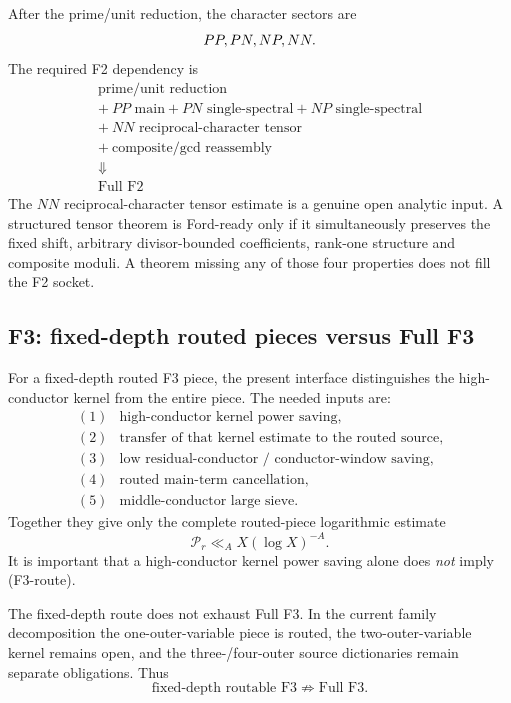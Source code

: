 \documentclass[11pt]{article}
\theoremstyle{definition}
\theoremstyle{remark}
\newcommand{\1}{\mathbf 1}
\begin{document}
After the prime/unit reduction, the character sectors are
\[
 PP,\\ PN,\\ NP,\\ NN.
\]
The required F2 dependency is
\[
 \boxed{\begin{array}{c}
 \text{prime/unit reduction}\\
 +\ PP\text{ main}+PN\text{ single-spectral}+NP\text{ single-spectral}\\
 +\ NN\text{ reciprocal-character tensor}\\
 +\ \text{composite/gcd reassembly}\\
 \Downarrow\\
 \text{Full F2}
 \end{array}}
\tag{F2-full}
\]
The $NN$ reciprocal-character tensor estimate is a genuine open analytic input.  A structured tensor theorem is
Ford-ready only if it simultaneously preserves the fixed shift, arbitrary divisor-bounded coefficients, rank-one
structure and composite moduli.  A theorem missing any of those four properties does not fill the F2 socket.

\subsection{F3: fixed-depth routed pieces versus Full F3}

For a fixed-depth routed F3 piece, the present interface distinguishes the high-conductor kernel from the entire
piece.  The needed inputs are:
\[
 \begin{array}{ll}
 (1)&\text{high-conductor kernel power saving},\\
 (2)&\text{transfer of that kernel estimate to the routed source},\\
 (3)&\text{low residual-conductor / conductor-window saving},\\
 (4)&\text{routed main-term cancellation},\\
 (5)&\text{middle-conductor large sieve}.
 \end{array}
\tag{F3-inputs}
\]
Together they give only the complete routed-piece logarithmic estimate
\[
 \boxed{\mathcal P_r\ll_A X(\log X)^{-A}.}
\tag{F3-route}
\]
It is important that a high-conductor kernel power saving alone does \emph{not} imply (F3-route).

The fixed-depth route does not exhaust Full F3.  In the current family decomposition the one-outer-variable
piece is routed, the two-outer-variable kernel remains open, and the three-/four-outer source dictionaries remain
separate obligations.  Thus
\[
 \boxed{\text{fixed-depth routable F3}\not\Rightarrow\text{Full F3}.}
\tag{F3-notfull}
\]
\end{document}
